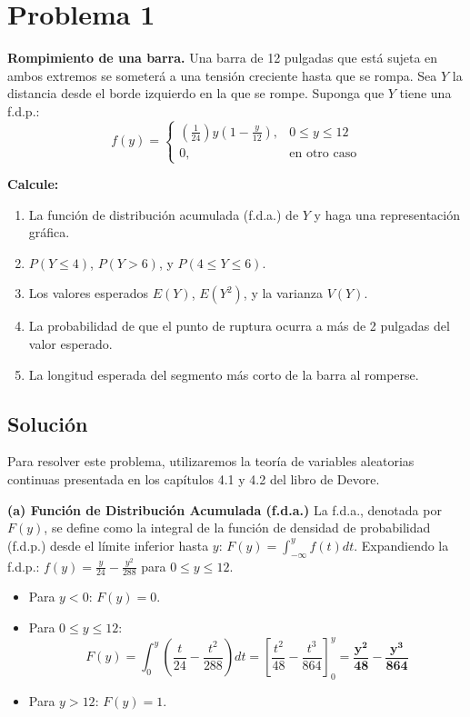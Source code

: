 \documentclass[a4paper]{article}
\begin{document}
\tableofcontents


\section{Problema 1}
\textbf{Rompimiento de una barra.} Una barra de 12 pulgadas que está sujeta en ambos extremos se someterá a una tensión creciente hasta que se rompa. Sea $Y$ la distancia desde el borde izquierdo en la que se rompe. Suponga que $Y$ tiene una f.d.p.:
$$f(y) = \begin{cases} \left(\frac{1}{24}\right) y \left(1 - \frac{y}{12}\right), & 0 \le y \le 12 \\ 0, & \text{en otro caso} \end{cases}$$

\textbf{Calcule:}
\begin{enumerate}
    \item[(a)] La función de distribución acumulada (f.d.a.) de $Y$ y haga una representación gráfica.
    \item[(b)] $P(Y \le 4)$, $P(Y > 6)$, y $P(4 \le Y \le 6)$.
    \item[(c)] Los valores esperados $E(Y)$, $E(Y^2)$, y la varianza $V(Y)$.
    \item[(d)] La probabilidad de que el punto de ruptura ocurra a más de 2 pulgadas del valor esperado.
    \item[(e)] La longitud esperada del segmento más corto de la barra al romperse.
\end{enumerate}

\subsection{Solución}

Para resolver este problema, utilizaremos la teoría de variables aleatorias continuas presentada en los capítulos 4.1 y 4.2 del libro de Devore.

\textbf{(a) Función de Distribución Acumulada (f.d.a.)}
La f.d.a., denotada por $F(y)$, se define como la integral de la función de densidad de probabilidad (f.d.p.) desde el límite inferior hasta $y$: $F(y) = \int_{-\infty}^{y} f(t) dt$.
Expandiendo la f.d.p.: $f(y) = \frac{y}{24} - \frac{y^2}{288}$ para $0 \le y \le 12$.

\begin{itemize}
    \item Para $y < 0$: $F(y) = 0$.
    \item Para $0 \le y \le 12$:
    $$F(y) = \int_{0}^{y} \left( \frac{t}{24} - \frac{t^2}{288} \right) dt = \left[ \frac{t^2}{48} - \frac{t^3}{864} \right]_{0}^{y} = \mathbf{\frac{y^2}{48} - \frac{y^3}{864}}$$
    \item Para $y > 12$: $F(y) = 1$.
\end{itemize}
\end{document}
